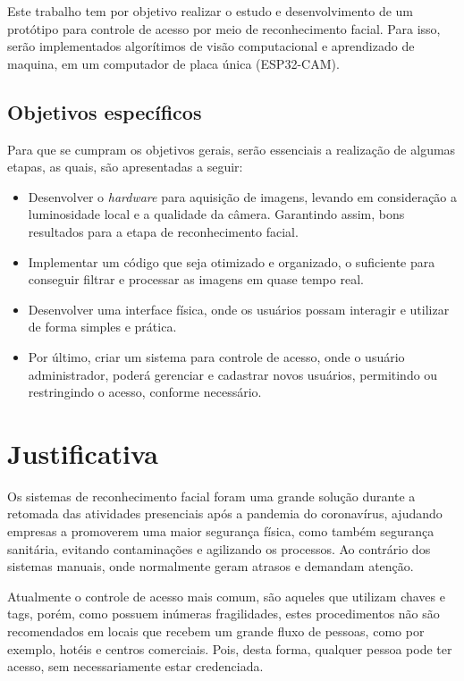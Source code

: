 Este trabalho tem por objetivo realizar o estudo e desenvolvimento de um protótipo 
para controle de acesso por meio de reconhecimento facial. Para isso, serão implementados 
algorítimos de visão computacional e aprendizado de maquina, em um computador de placa 
única (ESP32-CAM).

\subsection{Objetivos específicos}\label{subsec:objetivosEspecificos}

Para que se cumpram os objetivos gerais, serão essenciais a realização de algumas etapas, 
as quais, são apresentadas a seguir:

\begin{itemize}
    \item  Desenvolver o \textit{hardware} para aquisição de imagens, levando em 
    consideração a luminosidade local e a qualidade da câmera. Garantindo assim, 
    bons resultados para a etapa de reconhecimento facial.
  
    \item Implementar um código que seja otimizado e organizado, o suficiente para 
    conseguir filtrar e processar as imagens em quase tempo real. 
    
    \item Desenvolver uma interface física, onde os usuários possam interagir e 
    utilizar de forma simples e prática.
    
    \item Por último, criar um sistema para controle de acesso, onde o usuário 
    administrador, poderá gerenciar e cadastrar novos usuários, permitindo ou 
    restringindo o acesso, conforme necessário. 
\end{itemize}

\section{Justificativa}\label{sec:justificativa}

Os sistemas de reconhecimento facial foram uma grande solução durante a retomada 
das atividades presenciais após a pandemia do coronavírus, ajudando empresas
a promoverem uma maior segurança física, como também segurança sanitária, 
evitando contaminações e agilizando os processos. Ao contrário dos sistemas 
manuais, onde normalmente geram atrasos e demandam atenção.

Atualmente o controle de acesso mais comum, são aqueles que utilizam chaves 
e tags, porém, como possuem inúmeras fragilidades, estes procedimentos não são 
recomendados em locais que recebem um grande fluxo de pessoas, como por exemplo, 
hotéis e centros comerciais. Pois, desta forma, qualquer pessoa pode ter acesso, 
sem necessariamente estar credenciada.

